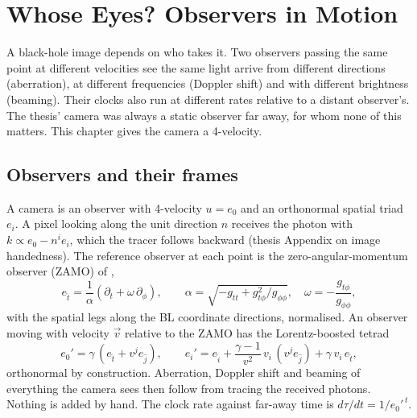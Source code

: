 \chapter{Whose Eyes? Observers in Motion}
\label{ch:xobs}

A black-hole image depends on who takes it. Two observers passing the same
point at different velocities see the same light arrive from different
directions (aberration), at different frequencies (Doppler shift) and with
different brightness (beaming). Their clocks also run at different rates
relative to a distant observer's. The thesis' camera was always a static
observer far away, for whom none of this matters. This chapter gives the
camera a 4-velocity.

\section{Observers and their frames}

A camera is an observer with 4-velocity $u = e_0$ and an orthonormal spatial
triad $e_i$. A pixel looking along the unit direction $n$ receives the photon
with $k \propto e_0 - n^i e_i$, which the tracer follows backward
(thesis Appendix on image handedness). The reference observer at each point
is the zero-angular-momentum observer (ZAMO) of \citet{BardeenPressTeukolsky1972},
\begin{equation}
e_{\hat t} = \frac{1}{\alpha}\left(\partial_t + \omega\,\partial_\phi\right),
\qquad
\alpha = \sqrt{-g_{tt} + g_{t\phi}^2/g_{\phi\phi}}, \quad
\omega = -\frac{g_{t\phi}}{g_{\phi\phi}},
\end{equation}
with the spatial legs along the BL coordinate directions, normalised. An
observer moving with velocity $\vec v$ relative to the ZAMO has the
Lorentz-boosted tetrad
\begin{equation}
e_0' = \gamma\,(e_{\hat t} + v^j e_{\hat j}), \qquad
e_i' = e_{\hat i} + \frac{\gamma - 1}{v^2}\,v_i\,(v^j e_{\hat j}) + \gamma\,v_i\,e_{\hat t},
\label{eq:boost}
\end{equation}
orthonormal by construction. Aberration, Doppler shift and beaming of
everything the camera sees then follow from tracing the received photons.
Nothing is added by hand. The clock rate against far-away time is
$d\tau/dt = 1/e_0'^{\,t}$.

